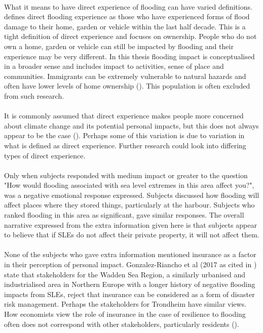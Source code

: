 \paragraph{}

What it means to have direct experience of flooding can have varied definitions. \cite{whitmarsh_are_2008} defines direct flooding experience as those who have experienced forms of flood damage to their home, garden or vehicle within the last half decade. This is a tight definition of direct experience and focuses on ownership. People who do not own a home, garden or vehicle can still be impacted by flooding and their experience may be very different. In this thesis flooding impact is conceptualised in a broader sense and includes impact to activities, sense of place and communities. Immigrants can be extremely vulnerable to natural hazards and often have lower levels of home ownership (\cite{normann_ssb_2017}). This population is often excluded from such research.   
\paragraph{}
It is commonly assumed that direct experience makes people more concerned about climate change and its potential personal impacts, but this does not always appear to be the case (\cite{lujala_role_2020}). Perhaps some of this variation is due to variation in what is defined as direct experience. Further research could look into differing types of direct experience. 
\paragraph{}
Only when subjects responded with medium impact or greater to the question "How would flooding associated with sea level extremes in this area affect you?", was a negative emotional response expressed. Subjects discussed how flooding will affect places where they stored things, particularly at the harbour. Subjects who ranked flooding in this area as significant, gave similar responses. The overall narrative expressed from the extra information given here is that subjects appear to believe that if SLEs do not affect their private property, it will not affect them. 
\paragraph{}
None of the subjects who gave extra information mentioned insurance as a factor in their perception of personal impact.  Gonzalez-Riancho et al (2017 as cited in \cite{gerkensmeier_governing_2018}) state that stakeholders for the Wadden Sea Region, a similarly urbanised and industrialised area in Northern Europe with a longer history of negative flooding impacts from SLEs, reject that insurance can be considered as a form of disaster risk management. Perhaps the stakeholders for Trondheim have similar views. How economists view the role of insurance in the case of resilience to flooding often does not correspond with other stakeholders, particularly residents (\cite{gerkensmeier_governing_2018}).
